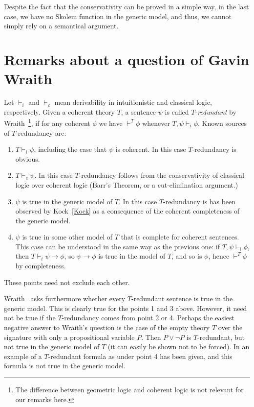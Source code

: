 \documentclass[10pt,a4paper]{article}
\begin{document}
\medskip

 Despite the fact that the conservativity can be proved in a simple way, in the last case, we
have no Skolem function in the generic model, and thus, we cannot simply rely on a semantical
argument.

\section{Remarks about a question of Gavin Wraith}

Let $\vdash_i$ and $\vdash_c$ mean derivability in intuitionistic and classical logic,
respectively. Given a coherent theory $T$, 
a sentence $\psi$ is called $T$-\emph{redundant} by
Wraith~\cite[p. 336]{Wraith}\footnote{The difference
between geometric logic and coherent logic is not relevant for our remarks here.},
if for any coherent $\phi$ we have
$\vdash^T \phi$ whenever $T,\psi \vdash_i \phi$.
Known sources of $T$-redundancy are:
\begin{enumerate}
\item $T \vdash_i \psi$, including the case that $\psi$ is coherent.
In this case $T$-redundancy is obvious.
\item $T \vdash_c \psi$. In this case $T$-redundancy follows from the conservativity
of classical logic over coherent logic (Barr's Theorem, or a cut-elimination argument.)
\item $\psi$ is true in the generic model of $T$. In this case $T$-redundancy is
has been observed by Kock~\ref{Kock} as a consequence of the coherent 
completeness of the generic model.
\item $\psi$ is true in some other model of $T$ that is complete for coherent 
sentences. This case can be understood in the same way as the previous one: 
if $T,\psi \vdash_i \phi$, then $T \vdash_i \psi\to\phi$, so $\psi\to\phi$ is true in
the model of $T$, and so is $\phi$, hence $\vdash^{T} \phi$ by completeness.
\end{enumerate}
These points need not exclude each other.

Wraith~\cite[p. 336]{Wraith} asks furthermore whether every $T$-redundant
sentence is true in the generic model. This is clearly true for the points 1 and 3 above.
However, it need not be true if the $T$-redundancy comes from point 2 or 4.
Perhaps the easiest negative answer to Wraith's question is the case of
the empty theory $T$ over the signature with only a propositional variable $P$.
Then $P\lor\neg P$ is $T$-redundant, but not true in the generic model of $T$
(it can easily be shown not to be forced). In \cite{BBC18} an example of
a $T$-redundant formula as under point 4 has been given, and this formula is
not true in the generic model.
\end{document}
